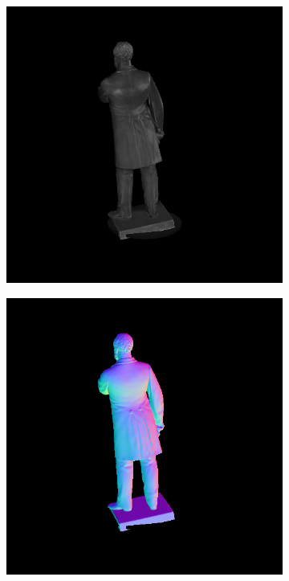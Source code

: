 \documentclass[border=15pt, multi, tikz]{article}
\begin{document}
\begin{figure}[H]
\begin{subfigure}[b]{0.20\linewidth}
	\end{subfigure}
	\begin{subfigure}[b]{0.20\linewidth}
		\includegraphics[width=\linewidth]{./Figures/test_scenes/05111.image0.png}
	\end{subfigure}
	\begin{subfigure}[b]{0.20\linewidth}
		\includegraphics[width=\linewidth]{./Figures/test_scenes/05111.normal0.png}
	\end{subfigure}
	

\end{figure}
\end{document}
